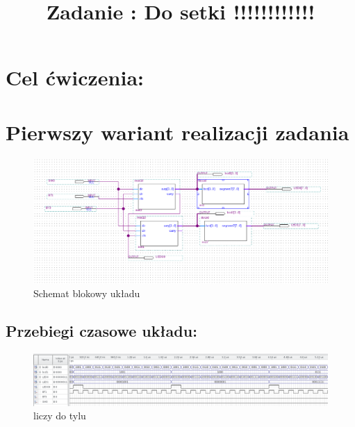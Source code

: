 \documentclass{classrep}
\author{
  \studentinfo{Witold Olechowski}{127517} \and
  \studentinfo{Tomasz Marecik}{127374}
}
\title{Zadanie : Do setki !!!!!!!!!!!!}
\begin{document}
\maketitle

\section{Cel ćwiczenia:}
\lipsum[1]

\section{Pierwszy wariant realizacji zadania}
\label{sec:pierw} %

\begin{figure}[H]  %
	\centering
	\includegraphics[width=1.0\linewidth]{blok}  %
	\caption{Schemat blokowy układu }
	\label{fig:block_bcd_segment}
\end{figure}

\lipsum[2]



\lipsum[3]




\subsection{Przebiegi czasowe układu:}
\lipsum[5]
\begin{figure}[H]
	\centering
	\includegraphics[width=1.0\linewidth]{up_down_1}
	\caption{liczy do tylu}
	\label{fig:symhex0}
\end{figure}
\end{document}

